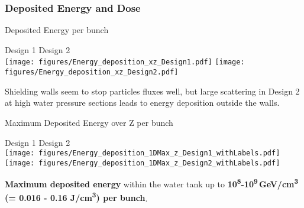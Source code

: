 \documentclass[xcolor={dvipsnames}]{beamer}
\begin{document}
\subsubsection{Deposited Energy and Dose}
\begin{frame}{Deposited Energy per bunch}
\begin{center}
\hspace*{1.6cm} Design 1 \hfill Design 2 \hspace*{1.8cm} \\
  \texttt{[image: figures/Energy\_deposition\_xz\_Design1.pdf]}
    \texttt{[image: figures/Energy\_deposition\_xz\_Design2.pdf]}
\end{center}
 Shielding walls seem to stop particles fluxes well, but large scattering in Design 2 at high water pressure sections leads to energy deposition outside the walls.
\end{frame}
\begin{frame}{Maximum Deposited Energy over Z per bunch}
\begin{center}
\hspace*{1.6cm} Design 1 \hfill Design 2 \hspace*{1.8cm} \\
  \texttt{[image: figures/Energy\_deposition\_1DMax\_z\_Design1\_withLabels.pdf]}
    \texttt{[image: figures/Energy\_deposition\_1DMax\_z\_Design2\_withLabels.pdf]}
\end{center}
  \textbf{Maximum deposited energy} within the water tank up to \textbf{10\textsuperscript{8}-10\textsuperscript{9}\,GeV/cm\textsuperscript{3} (= 0.016 - 0.16 J/cm\textsuperscript{3}) per bunch}.
\end{frame}
\end{document}

